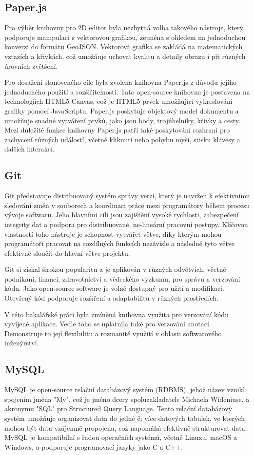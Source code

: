 \subsection{Paper.js}
Pro výběr knihovny pro 2D editor byla nezbytná volba takového nástroje, který podporuje manipulaci s vektorovou grafikou, zejména s ohledem na jednoduchou konverzi do formátu GeoJSON. Vektorová grafika se zakládá na matematických vztazích a křivkách, což umožňuje uchovat kvalitu a detaily obrazu i při různých úrovních zvětšení.

Pro dosažení stanoveného cíle byla zvolena knihovna Paper.js z důvodu jejího jednoduchého použití a rozšiřitelnosti. Tato open-source knihovna je postavena na technologiích HTML5 Canvas, což je HTML5 prvek umožňující vykreslování grafiky pomocí JavaScriptu. Paper.js poskytuje objektový model dokumentu a umožňuje snadné vytváření prvků, jako jsou body, trojúhelníky, křivky a cesty. Mezi důležité funkce knihovny Paper.js patří také poskytování rozhraní pro zachycení různých událostí, včetně kliknutí nebo pohybu myší, stisku klávesy a dalších interakcí. \cite{Paper.js}

\subsection{Git}
Git představuje distribuovaný systém správy verzí, který je navržen k efektivnímu sledování změn v souborech a koordinaci práce mezi programátory během procesu vývoje softwaru. Jeho hlavními cíli jsou zajištění vysoké rychlosti, zabezpečení integrity dat a podpora pro distribuované, ne-lineární pracovní postupy. Klíčovou vlastností toho nástroje je schopnost vytvářet větve, díky kterým mohou programátoří pracovat na rozdílných funkcích nezávisle a následně tyto větve efektivně sloučit do hlavní větve projektu. \cite{chacon2014progit}

Git si získal širokou popularitu a je aplikován v různých odvětvích, včetně podnikání, financí, zdravotnictví a vědeckého výzkumu, pro správu a verzování kódu. Jako open-source software je volně dostupný pro užití a modifikaci. Otevřený kód podporuje rozšíření a adaptabilitu v různých prostředích. \cite{mijacobs_git_azure_2023}

V této bakalářské práci byla zmíněná knihovna využita pro verzování kódu vyvíjené aplikace. Vedle toho se uplatnila také pro verzování anotací. Demonstruje to její flexibilitu a rozmanité využití v oblasti softwarového inženýrství.\cite{Git}

\subsection{MySQL}
MySQL je open-source relační databázový systém (RDBMS), jehož název vznikl spojením jména "My", což je jméno dcery spoluzakladatele Michaela Wideniuse, a akronymu "SQL" pro Structured Query Language. Tento relační databázový systém umožňuje organizovat data do jedné či více datových tabulek, ve kterých mohou být data vzájemně propojena, což napomáhá efektivně strukturovat data. MySQL je kompatibilní s řadou operačních systémů, včetně Linuxu, macOS a Windows, a podporuje programovací jazyky jako C a C++.

